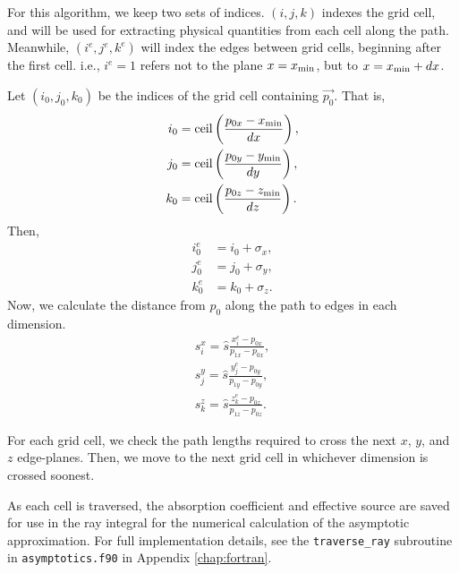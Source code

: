 For this algorithm, we keep two sets of indices. $(i,j,k)$ indexes the grid
cell, and will be used for extracting physical quantities from each cell along
the path.
Meanwhile, $(i^e,j^e,k^e)$ will index the edges between grid cells, beginning
after the first cell. i.e., $i^e=1$ refers not to the plane $x={x_{\min}}$, but to $x={x_{\min}}+dx$.

Let $(i_0, j_0, k_0)$ be the indices of the grid cell containing $\vec{p_0}$.
That is,
\begin{align}
  i_0 &= \mbox{ceil}\left(\frac{p_{0x}-{x_{\min}}}{dx}\right), \\
  j_0 &= \mbox{ceil}\left(\frac{p_{0y}-{y_{\min}}}{dy}\right), \\
  k_0 &= \mbox{ceil}\left(\frac{p_{0z}-{z_{\min}}}{dz}\right).
\end{align}
Then,
\begin{align}
  i_0^e &= i_0 + \sigma_x, \\
  j_0^e &= j_0 + \sigma_y, \\
  k_0^e &= k_0 + \sigma_z.
\end{align}
Now, we calculate the distance from $p_0$ along the path to edges in each dimension.
\begin{align}
  s_i^x = \hat{s}\frac{x_i^e-p_{0x}}{p_{1x}-p_{0x}}, \\
  s_j^y = \hat{s}\frac{y_j^e-p_{0y}}{p_{1y}-p_{0y}}, \\
  s_k^z = \hat{s}\frac{z_k^e-p_{0z}}{p_{1z}-p_{0z}}.
\end{align}

For each grid cell, we check the path lengths
required to cross the next $x$, $y$, and $z$ edge-planes.
Then, we move to the next grid cell in whichever dimension
is crossed soonest.

As each cell is traversed, the absorption coefficient and effective source are saved for use in the ray integral for the numerical calculation of the asymptotic approximation.
For full implementation details, see the \texttt{traverse\_ray} subroutine in \texttt{asymptotics.f90} in Appendix \ref{chap:fortran}.

